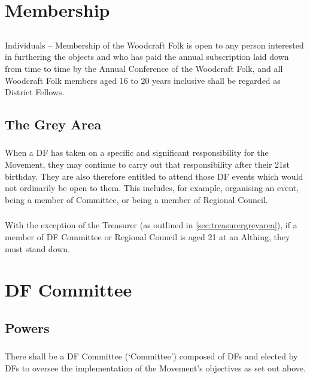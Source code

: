 \documentclass[a4paper, 12pt]{article}
\begin{document}
\section{Membership}
\subsection{}
\label{sec:membership}
Individuals -- Membership of the Woodcraft Folk is open to any person interested in furthering the objects and who has paid the annual subscription laid down from time to time by the Annual Conference of the Woodcraft Folk, and all Woodcraft Folk members aged 16 to 20 years inclusive shall be regarded as District Fellows.
\subsection{The Grey Area}
\label{sec:greyarea}
\subsubsection{}
When a DF has taken on a specific and significant responsibility for the Movement, they may continue to carry out that responsibility after their 21st birthday. They are also therefore entitled to attend those DF events which would not ordinarily be open to them. This includes, for example, organising an event, being a member of Committee, or being a member of Regional Council.
\subsubsection{}
With the exception of the Treasurer (as outlined in \ref{sec:treasurergreyarea}), if a member of DF Committee or Regional Council is aged 21 at an Althing, they must stand down.

\section{DF Committee}
\subsection{Powers}
\subsubsection{}
There shall be a DF Committee (`Committee') composed of DFs and elected by DFs to oversee the implementation of the Movement's objectives as set out above.
\end{document}
